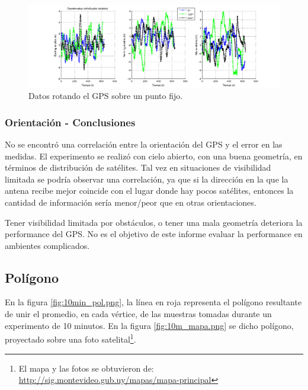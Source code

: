 \documentclass[main]{subfiles}
\begin{document}
\begin{figure}[h!]
\hspace{-70pt}
  \includegraphics[width=1.4\textwidth]{./pics_gps/orientacion_individual.png}
  \caption{Datos rotando el GPS sobre un punto fijo.}
  \label{fig:orientacion_individual.png}
\end{figure}

\subsubsection{Orientación - Conclusiones}
\label{sec:orientacion-conclusiones}

No se encontró una correlación entre la orientación del GPS y el error en las medidas.
El experimento se realizó con cielo abierto, con una buena geometría, en términos de distribución de satélites. Tal vez en situaciones de visibilidad limitada se podría observar una correlación, ya que si la dirección en la que la antena recibe mejor coincide con el lugar donde hay pocos satélites, entonces la cantidad de información sería menor/peor que en otras orientaciones.

Tener visibilidad limitada por obstáculos, o tener una mala geometría deteriora la performance del GPS. No es el objetivo de este informe evaluar la performance en ambientes complicados.


\newpage
\subsection{Polígono}
\label{sec:gps2-poligono}

En la figura \ref{fig:10min_pol.png}, la línea en roja representa el polígono resultante de unir el promedio, en cada vértice, de las muestras tomadas durante un experimento de 10 minutos. En la figura \ref{fig:10m_mapa.png} se dicho polígono, proyectado sobre una foto satelital\footnote{El mapa y las fotos se obtuvieron de:\\ \url{http://sig.montevideo.gub.uy/mapas/mapa-principal}}.
\end{document}
